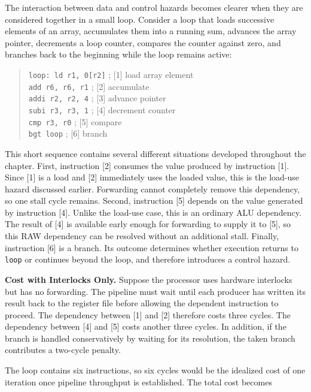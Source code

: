 \documentclass[11pt,a4paper]{report}
\begin{document}
The interaction between data and control hazards becomes clearer when they are considered together in a small loop. Consider a loop that loads successive elements of an array, accumulates them into a running sum, advances the array pointer, decrements a loop counter, compares the counter against zero, and branches back to the beginning while the loop remains active:

\begin{quote}
\texttt{loop: ld r1, 0[r2]} \quad ; [1] load array element \\
\texttt{\phantom{loop: }add r6, r6, r1} \quad ; [2] accumulate \\
\texttt{\phantom{loop: }addi r2, r2, 4} \quad ; [3] advance pointer \\
\texttt{\phantom{loop: }subi r3, r3, 1} \quad ; [4] decrement counter \\
\texttt{\phantom{loop: }cmp r3, r0} \quad ; [5] compare \\
\texttt{\phantom{loop: }bgt loop} \quad ; [6] branch
\end{quote}

This short sequence contains several different situations developed throughout the chapter. First, instruction [2] consumes the value produced by instruction [1]. Since [1] is a load and [2] immediately uses the loaded value, this is the load-use hazard discussed earlier. Forwarding cannot completely remove this dependency, so one stall cycle remains. Second, instruction [5] depends on the value generated by instruction [4]. Unlike the load-use case, this is an ordinary ALU dependency. The result of [4] is available early enough for forwarding to supply it to [5], so this RAW dependency can be resolved without an additional stall. Finally, instruction [6] is a branch. Its outcome determines whether execution returns to \texttt{loop} or continues beyond the loop, and therefore introduces a control hazard.

\textbf{Cost with Interlocks Only.} Suppose the processor uses hardware interlocks but has no forwarding. The pipeline must wait until each producer has written its result back to the register file before allowing the dependent instruction to proceed. The dependency between [1] and [2] therefore costs three cycles. The dependency between [4] and [5] costs another three cycles. In addition, if the branch is handled conservatively by waiting for its resolution, the taken branch contributes a two-cycle penalty.

The loop contains six instructions, so six cycles would be the idealized cost of one iteration once pipeline throughput is established. The total cost becomes
\end{document}
